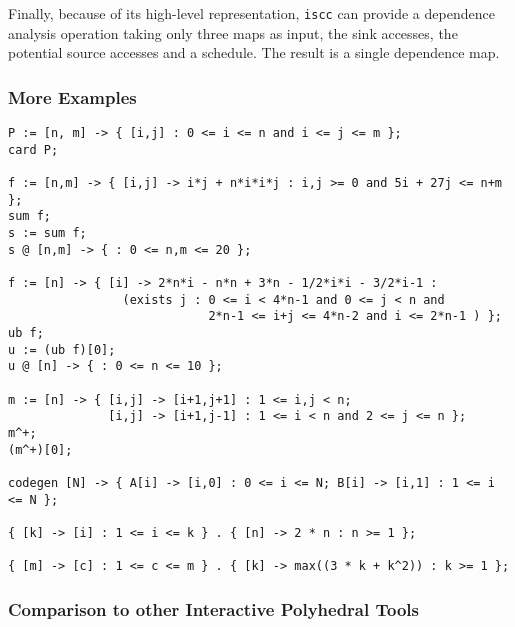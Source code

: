 Finally, because of its high-level representation, {\tt iscc} can
provide a dependence analysis operation taking only three maps as input,
the sink accesses, the potential source accesses and a schedule.
The result is a single dependence map.


\subsubsection{More Examples}
\begin{verbatim}
P := [n, m] -> { [i,j] : 0 <= i <= n and i <= j <= m };
card P;

f := [n,m] -> { [i,j] -> i*j + n*i*i*j : i,j >= 0 and 5i + 27j <= n+m };
sum f;
s := sum f;
s @ [n,m] -> { : 0 <= n,m <= 20 };

f := [n] -> { [i] -> 2*n*i - n*n + 3*n - 1/2*i*i - 3/2*i-1 :
                (exists j : 0 <= i < 4*n-1 and 0 <= j < n and
                            2*n-1 <= i+j <= 4*n-2 and i <= 2*n-1 ) };
ub f;
u := (ub f)[0];
u @ [n] -> { : 0 <= n <= 10 };

m := [n] -> { [i,j] -> [i+1,j+1] : 1 <= i,j < n;
              [i,j] -> [i+1,j-1] : 1 <= i < n and 2 <= j <= n };
m^+;
(m^+)[0];

codegen [N] -> { A[i] -> [i,0] : 0 <= i <= N; B[i] -> [i,1] : 1 <= i <= N };

{ [k] -> [i] : 1 <= i <= k } . { [n] -> 2 * n : n >= 1 };

{ [m] -> [c] : 1 <= c <= m } . { [k] -> max((3 * k + k^2)) : k >= 1 };
\end{verbatim}

\subsubsection{Comparison to other Interactive Polyhedral Tools}

